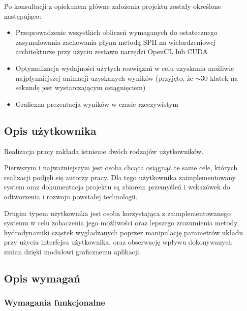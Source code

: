 \documentclass[polish, 12pt]{aghthesis}
\begin{document}
	Po konsultacji z opiekunem główne założenia projektu zostały określone następująco:
	
	\begin{itemize}
	
		\item Przeprowadzenie wszystkich obliczeń wymaganych do ostatecznego zasymulowania zachowania płynu metodą SPH na wielordzeniowej architekturze przy użyciu zestawu narzędzi OpenCL lub CUDA
				
		\item Optymalizacja wydajności użytych rozwiązań w celu uzyskania możliwie najpłynniejszej animacji uzyskanych wyników (przyjęto, że $\sim 30$ klatek na sekundę jest wystarczającym osiągnięciem)
		
		\item Graficzna prezentacja wyników w czasie rzeczywistym
		
	\end{itemize}
	
	
	\subsection{Opis użytkownika}
	
	Realizacja pracy zakłada istnienie dwóch rodzajów użytkowników.
	
	Pierwszym i najważniejszym jest osoba chcąca osiągnąć te same cele, których realizacji podjęli się autorzy pracy. Dla tego użytkownika zaimplementowany system oraz dokumentacja projektu są zbiorem przemyśleń i wskazówek do odtworzenia i rozwoju powstałej technologii.
	
	Drugim typem użytkownika jest osoba korzystająca z zaimplementowanego systemu w celu zobaczenia jego możliwości oraz lepszego zrozumienia metody hydrodynamiki cząstek wygładzanych poprzez manipulację parametrów układu przy użyciu interfejsu użytkownika, oraz obserwację wpływu dokonywanych zmian dzięki modułowi graficznemu aplikacji.
	
	\subsection{Opis wymagań}
	
		\subsubsection{Wymagania funkcjonalne}
		
\end{document}
